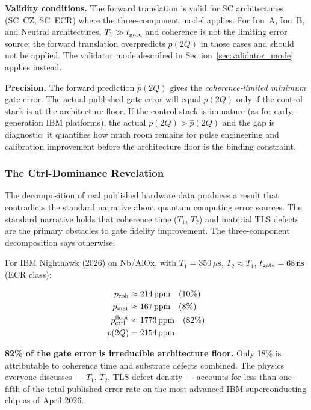 \documentclass[12pt,a4paper]{article}
\begin{document}
\textbf{Validity conditions.} The forward translation is valid for SC
architectures (SC~CZ, SC~ECR) where the three-component model applies.
For Ion~A, Ion~B, and Neutral architectures, $T_1 \gg t_{\rm gate}$ and
coherence is not the limiting error source; the forward translation
overpredicts $p(2Q)$ in those cases and should not be applied. The validator
mode described in Section~\ref{sec:validator_mode} applies instead.

\textbf{Precision.} The forward prediction $\hat{p}(2Q)$ gives the
\emph{coherence-limited minimum} gate error. The actual published gate error
will equal $\hat{p}(2Q)$ only if the control stack is at the architecture
floor. If the control stack is immature (as for early-generation IBM platforms),
the actual $p(2Q) > \hat{p}(2Q)$ and the gap is diagnostic: it quantifies
how much room remains for pulse engineering and calibration improvement before
the architecture floor is the binding constraint.

\subsubsection{The Ctrl-Dominance Revelation}
\label{sec:ctrl_dominance}

The decomposition of real published hardware data produces a result that
contradicts the standard narrative about quantum computing error sources.
The standard narrative holds that coherence time ($T_1$, $T_2$) and material
TLS defects are the primary obstacles to gate fidelity improvement.
The three-component decomposition says otherwise.

For IBM Nighthawk (2026) on Nb/AlOx, with $T_1 = 350\,\mu\text{s}$,
$T_2 \approx T_1$, $t_{\rm gate} = 68\,\text{ns}$ (ECR class):

\begin{equation}
\begin{aligned}
p_{\rm coh} &\approx 214\,\text{ppm} \quad (10\%) \\
p_{\rm mat} &\approx 167\,\text{ppm} \quad (8\%) \\
p_{\rm ctrl}^{\rm floor} &\approx 1773\,\text{ppm} \quad (82\%) \\
p(2Q) &= 2154\,\text{ppm}
\end{aligned}
\label{eq:nighthawk_decomp}
\end{equation}

\textbf{82\% of the gate error is irreducible architecture floor.}
Only 18\% is attributable to coherence time and substrate defects combined.
The physics everyone discusses --- $T_1$, $T_2$, TLS defect density --- accounts
for less than one-fifth of the total published error rate on the most advanced
IBM superconducting chip as of April 2026.
\end{document}
